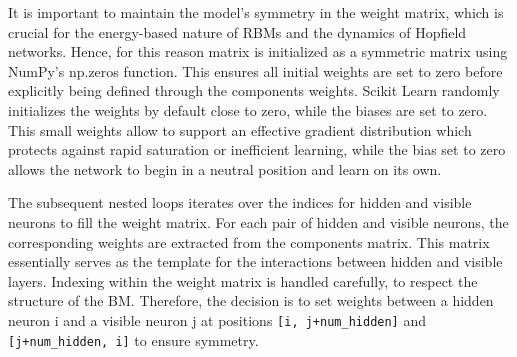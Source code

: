 It is important to maintain the model's symmetry in the weight matrix, which is crucial for the energy-based nature of \ac{RBM}s and the dynamics of Hopfield networks.
Hence, for this reason matrix is initialized as a symmetric matrix using NumPy's np.zeros function.
This ensures all initial weights are set to zero before explicitly being defined through the components weights.
Scikit Learn randomly initializes the weights by default close to zero, while the biases are set to zero. 
This small weights allow to support an effective gradient distribution which protects against rapid saturation or inefficient learning,
while the bias set to zero allows the network to begin in a neutral position and learn on its own. 

The subsequent nested loops iterates over the indices for hidden and visible neurons to fill the weight matrix.
For each pair of hidden and visible neurons, the corresponding weights are extracted from the components matrix.
This matrix essentially serves as the template for the interactions between hidden and visible layers.
Indexing within the weight matrix is handled carefully, to respect the structure of the \ac{BM}. 
Therefore, the decision is to set weights between a hidden neuron i and a visible neuron j at positions \texttt{[i, j+num\_hidden]} and \texttt{[j+num\_hidden, i]} to ensure symmetry.

